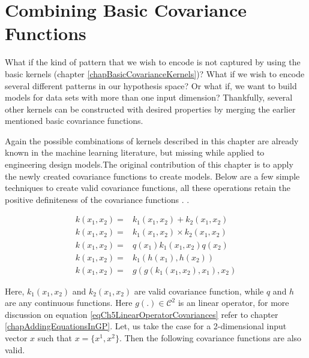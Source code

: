 \chapter{Combining Basic Covariance Functions}
\label{chapCombiningBasicCovariances}

What if the kind of pattern that we wish to encode is not captured by using the basic kernels (chapter \ref{chapBasicCovarianceKernels})? What if we wish to encode several different patterns in our hypothesis space? Or what if, we want to build models for data sets with more than one input dimension? Thankfully, several other kernels can be constructed with desired properties by merging the earlier mentioned basic covariance functions. 

Again the possible combinations of kernels described in this chapter are already known in the machine learning literature, but missing while applied to engineering design models.The original contribution of this chapter is to apply the newly created covariance functions to create models. Below are a few simple techniques to create valid covariance functions, all these operations retain the positive definiteness of the covariance functions \cite{bishop2006pattern, mackay2003information, durrande2001etude, durrande2013anova}. . 



\begin{align}
k(x_{1}, x_{2}) =  & k_{1}(x_{1}, x_{2}) + k_{2}(x_{1}, x_{2})  \label{eqCh5AddingCovariances} \\
k(x_{1}, x_{2}) =  & k_{1}(x_{1}, x_{2}) \times k_{2}(x_{1}, x_{2}) \label{eqCh5MultiplyingCovariances} \\
k(x_{1}, x_{2}) =  & q(x_{1})k_{1}(x_{1}, x_{2})q(x_{2}) \label{eqCh5MultiplyingWithFunction} \\
k(x_{1}, x_{2}) =  & k_{1}(h(x_{1}), h(x_{2})) \label{eqCh5ComposedCovariances} \\
k(x_{1}, x_{2}) =  & g(g(k_{1}(x_{1}, x_{2}), x_{1}), x_{2} ) \label{eqCh5LinearOperatorCovariances}
\end{align}


Here, $k_{1}(x_{1}, x_{2})$ and $k_{2}(x_{1}, x_{2})$ are valid covariance function, while $q$ and $h$ are any continuous functions. Here $g\left ( . \right ) \in \mathcal{C}^{2}$ is an linear operator, for more discussion on equation \ref{eqCh5LinearOperatorCovariances} refer to chapter \ref{chapAddingEquationsInGP}. Let, us take the case for a 2-dimensional input vector $x$ such that $x = \{x^{1}, x^{2}\}$. Then the following covariance functions are also valid.

